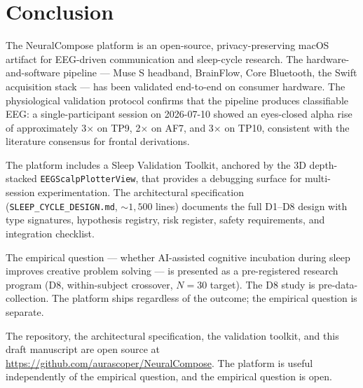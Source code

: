 \section{Conclusion}
\label{sec:conclusion}

The NeuralCompose platform is an open-source, privacy-preserving macOS
artifact for EEG-driven communication and sleep-cycle research. The
hardware-and-software pipeline --- Muse S headband, BrainFlow, Core
Bluetooth, the Swift acquisition stack --- has been validated end-to-end
on consumer hardware. The physiological validation protocol confirms
that the pipeline produces classifiable EEG: a single-participant session
on 2026-07-10 showed an eyes-closed alpha rise of approximately
3$\times$ on TP9, 2$\times$ on AF7, and 3$\times$ on TP10, consistent
with the literature consensus for frontal derivations.

The platform includes a Sleep Validation Toolkit, anchored by the
3D depth-stacked \texttt{EEGScalpPlotterView}, that provides a debugging
surface for multi-session experimentation. The architectural
specification (\texttt{SLEEP\_CYCLE\_DESIGN.md}, $\sim 1{,}500$ lines)
documents the full D1--D8 design with type signatures, hypothesis
registry, risk register, safety requirements, and integration
checklist.

The empirical question --- whether AI-assisted cognitive incubation
during sleep improves creative problem solving --- is presented as a
pre-registered research program (D8, within-subject crossover, $N=30$
target). The D8 study is pre-data-collection. The platform ships
regardless of the outcome; the empirical question is separate.

The repository, the architectural specification, the validation toolkit,
and this draft manuscript are open source at
\url{https://github.com/aurascoper/NeuralCompose}. The platform is
useful independently of the empirical question, and the empirical
question is open.

